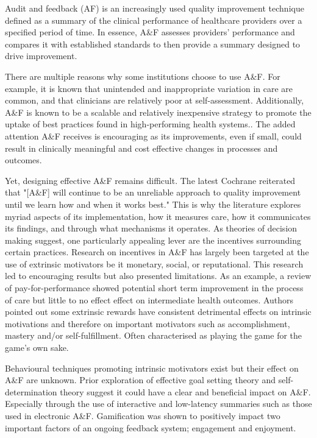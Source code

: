 Audit and feedback (\gls{AF}) is an increasingly used quality improvement technique defined as a summary of the clinical performance of healthcare providers over a specified period of time. In essence, A\&F assesses providers' performance and compares it with established standards to then provide a summary designed to drive improvement.\cite{ivers2012audit}

There are multiple reasons why some institutions choose to use A\&F. For example, it is known that unintended and inappropriate variation in care are common, and that clinicians are relatively poor at self-assessment.\cite{davis2006accuracy} Additionally, A\&F is known to be a scalable and relatively inexpensive strategy to promote the uptake of best practices found in high-performing health systems.\cite{baker2015creating}. The added attention A\&F receives is encouraging as its improvements, even if small, could result in clinically meaningful and cost effective changes in processes and outcomes.\cite{ivers2018using}

Yet, designing effective A\&F remains difficult. The latest Cochrane reiterated that "[A\&F] will continue to be an unreliable approach to quality improvement until we learn how and when it works best."\cite{foy2005we} This is why the literature explores myriad aspects of its implementation, how it measures care, how it communicates its findings, and through what mechanisms it operates. As theories of decision making suggest, one particularly appealing lever are the  incentives surrounding certain practices. Research on incentives in A\&F has largely been targeted at the use of extrinsic motivators be it monetary\cite{campbell2007payperf}, social\cite{ehrenfeld2014automated}, or reputational\cite{schneider1998use}. This research led to encouraging results but also presented limitations. As an example, a review of pay-for-performance showed potential short term improvement in the process of care but little to no effect effect on intermediate health outcomes.\cite{mendelson2017effects} Authors pointed out some extrinsic rewards have consistent detrimental effects on intrinsic motivations and therefore on important motivators such as accomplishment, mastery and/or self-fulfillment\cite{deci1999meta}. Often characterised as playing the game for the game's own sake.

Behavioural techniques promoting intrinsic motivators exist but their effect on A\&F are unknown. Prior exploration of effective goal setting theory and self-determination theory suggest it could have a clear and beneficial impact on A\&F. Especially through the use of interactive and low-latency summaries such as those used in electronic A\&F. Gamification was shown to positively impact two important factors of an ongoing feedback system; engagement and enjoyment.\cite{hamari2014does}